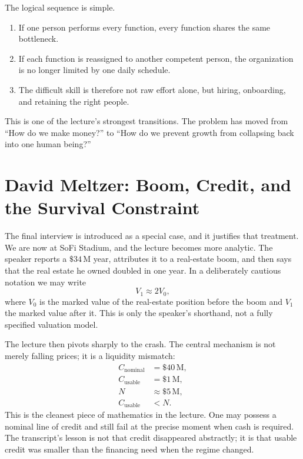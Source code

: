 The logical sequence is simple.
\begin{enumerate}
\item If one person performs every function, every function shares the same bottleneck.
\item If each function is reassigned to another competent person, the organization is no longer limited by one daily schedule.
\item The difficult skill is therefore not raw effort alone, but hiring, onboarding, and retaining the right people.
\end{enumerate}

This is one of the lecture's strongest transitions. The problem has moved from ``How do we make money?'' to ``How do we prevent growth from collapsing back into one human being?''

\section{David Meltzer: Boom, Credit, and the Survival Constraint}

The final interview is introduced as a special case, and it justifies that treatment. We are now at SoFi Stadium, and the lecture becomes more analytic. The speaker reports a \(\$34\,\mathrm{M}\) year, attributes it to a real-estate boom, and then says that the real estate he owned doubled in one year. In a deliberately cautious notation we may write
\begin{equation}
V_1 \approx 2V_0,
\end{equation}
where \(V_0\) is the marked value of the real-estate position before the boom and \(V_1\) the marked value after it. This is only the speaker's shorthand, not a fully specified valuation model.

The lecture then pivots sharply to the crash. The central mechanism is not merely falling prices; it is a liquidity mismatch:
\begin{align}
C_{\mathrm{nominal}} &= \$40\,\mathrm{M},\\
C_{\mathrm{usable}} &= \$1\,\mathrm{M},\\
N &\approx \$5\,\mathrm{M},\\
C_{\mathrm{usable}} &< N.
\end{align}
This is the cleanest piece of mathematics in the lecture. One may possess a nominal line of credit and still fail at the precise moment when cash is required. The transcript's lesson is not that credit disappeared abstractly; it is that usable credit was smaller than the financing need when the regime changed.


